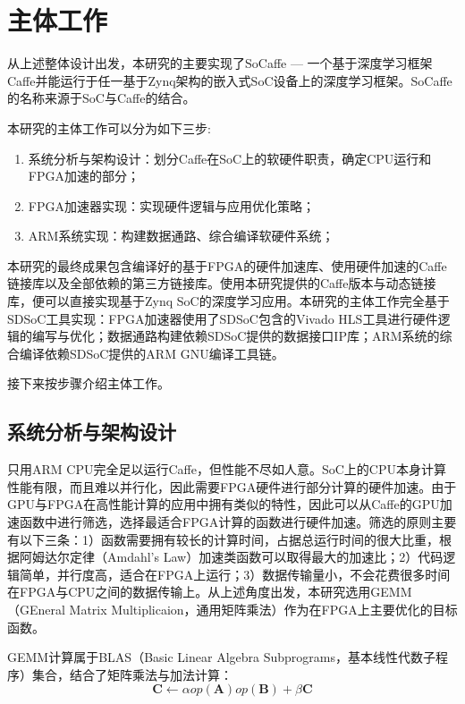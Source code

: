 \chapter{主体工作}

从上述整体设计出发，本研究的主要实现了SoCaffe — 一个基于深度学习框架Caffe并能运行于任一基于Zynq架构的嵌入式SoC设备上的深度学习框架。SoCaffe的名称来源于SoC与Caffe的结合。

本研究的主体工作可以分为如下三步:
\begin{enumerate}
\item 系统分析与架构设计：划分Caffe在SoC上的软硬件职责，确定CPU运行和FPGA加速的部分；
\item FPGA加速器实现：实现硬件逻辑与应用优化策略；
\item ARM系统实现：构建数据通路、综合编译软硬件系统；
\end{enumerate}

本研究的最终成果包含编译好的基于FPGA的硬件加速库、使用硬件加速的Caffe链接库以及全部依赖的第三方链接库。使用本研究提供的Caffe版本与动态链接库，便可以直接实现基于Zynq SoC的深度学习应用。本研究的主体工作完全基于SDSoC工具实现：FPGA加速器使用了SDSoC包含的Vivado HLS工具进行硬件逻辑的编写与优化；数据通路构建依赖SDSoC提供的数据接口IP库；ARM系统的综合编译依赖SDSoC提供的ARM GNU编译工具链。

接下来按步骤介绍主体工作。

\section{系统分析与架构设计}

只用ARM CPU完全足以运行Caffe，但性能不尽如人意。SoC上的CPU本身计算性能有限，而且难以并行化，因此需要FPGA硬件进行部分计算的硬件加速。由于GPU与FPGA在高性能计算的应用中拥有类似的特性，因此可以从Caffe的GPU加速函数中进行筛选，选择最适合FPGA计算的函数进行硬件加速。筛选的原则主要有以下三条：1）函数需要拥有较长的计算时间，占据总运行时间的很大比重，根据阿姆达尔定律（Amdahl's Law）加速类函数可以取得最大的加速比；2）代码逻辑简单，并行度高，适合在FPGA上运行；3）数据传输量小，不会花费很多时间在FPGA与CPU之间的数据传输上。从上述角度出发，本研究选用GEMM（GEneral Matrix Multiplicaion，通用矩阵乘法）作为在FPGA上主要优化的目标函数。

GEMM计算属于BLAS（Basic Linear Algebra Subprograms，基本线性代数子程序）集合，结合了矩阵乘法与加法计算：
\begin{equation}\label{eq:gemm}
\mathbf{C} \leftarrow \alpha op(\mathbf{A})op(\mathbf{B}) + \beta \mathbf{C}
\end{equation}

